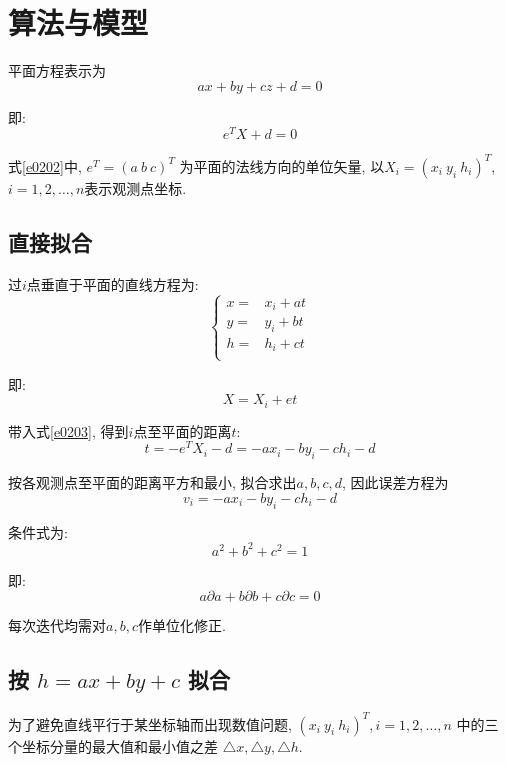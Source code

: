 \section{算法与模型}
平面方程表示为
\begin{equation}
    ax+by+cz+d=0 \label{e0201}
\end{equation}

即:
\begin{equation}
    e^{T}X+d=0 \label{e0202}
\end{equation}

式\eqref{e0202}中, $e^{T}=(a\ b\ c)^{T}$ 为平面的法线方向的单位矢量, 以$X_i=(x_i\ y_i\ h_i)^T$, $i=1,2,\ldots,n$表示观测点坐标.

\subsection{直接拟合}
过$i$点垂直于平面的直线方程为:
\begin{equation}
    \left\{
    \begin{array}{rl}
        x = & x_i + at \\
        y = & y_i + bt \\
        h = & h_i + ct \\
    \end{array}
    \right.
\end{equation}

即:
\begin{equation}
    X = X_i + et \label{e0203}
\end{equation}

带入式\eqref{e0203}, 得到$i$点至平面的距离$t$:
\begin{equation}
    t = -e^TX_i-d = -ax_i-by_i-ch_i-d
\end{equation}

按各观测点至平面的距离平方和最小, 拟合求出$a,b,c,d$, 因此误差方程为
\begin{equation}
    v_i = -ax_i-by_i-ch_i-d
\end{equation}

条件式为:
\begin{equation}
    a^2 + b^2 + c^2 = 1
\end{equation}

即:
\begin{equation}
    a\partial a + b\partial b + c\partial c = 0
\end{equation}

每次迭代均需对$a,b,c$作单位化修正.

\subsection{按 \texorpdfstring{$h=ax+by+c$}{h=ax+by+c} 拟合}
为了避免直线平行于某坐标轴而出现数值问题, $(x_i\ y_i\ h_i)^T, i=1,2,\ldots,n$ 中的三个坐标分量的最大值和最小值之差 $\triangle x, \triangle y, \triangle h$.

